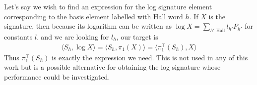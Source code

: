 Let's say we wish to find an expression for the log signature element corresponding to the basis element labelled with Hall word $h$.
If $X$ is the signature, then because its logarithm can be written as $\log X=\sum_{h' \text{ Hall}}l_{h'}P_{h'}$ for constants $l_\cdot$ and we are looking for $l_h$, our target is %
\begin{align}
\langle S_{h},\log X\rangle=\langle S_{h},\pi_1(X)\rangle=\langle \pi_1^\top(S_{h}),X\rangle
\end{align}
Thus $\pi_1^\top(S_{h})$ is exactly the expression we need.
This is not used in any of this work but is a possible alternative for obtaining the log signature whose performance could be investigated.


